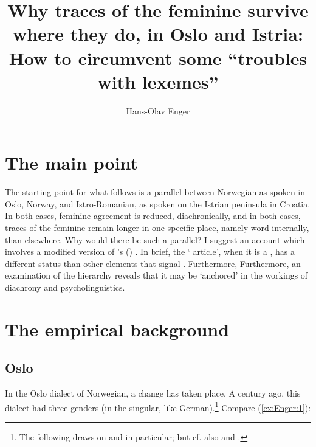 \documentclass[output=paper]{langsci/langscibook}
\title{Why traces of the feminine survive where they do, in Oslo and Istria: How to circumvent some ``troubles with lexemes''}
\author{Hans-Olav Enger}
\begin{document}

\section{The main point}

The starting-point for what follows is a parallel between Norwegian as
spoken in Oslo, Norway, and Istro-Romanian, as spoken on the Istrian
peninsula in Croatia. In both cases, feminine agreement is reduced,
diachronically, and in both cases, traces of the feminine remain longer
in one specific place, namely word-internally, than elsewhere. Why would
there be such a parallel? I suggest an account which involves a modified
version of %
\citeauthor{Corbett79}'s (\citeyear{Corbett79,Corbett2006}) %
%
. In brief, the
` article', when it is a , has a different status than
other elements that signal . Furthermore, Furthermore, an examination of the hierarchy reveals that it may be `anchored' in the workings of diachrony and
psycholinguistics.

\section{The empirical background}
\label{sec:enger:2.1}
\subsection{Oslo}

In the Oslo dialect of Norwegian, a change has taken place. A century
ago, this dialect had three genders (in the singular, like German).\footnote{The following draws on %
\citet{Larsen1907} %
%
and %
\citet{Lodrup11} 
  in particular; but cf. also %
\citet{Enger2004a,Enger2004b} %
%
and %
\citet{Opsahl09}%
%
.}
Compare (\ref{ex:Enger:1}):
\end{document}
